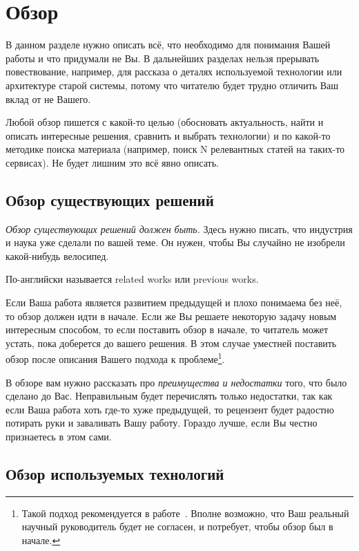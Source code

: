 
\section{Обзор}
\label{sec:relatedworks}

В данном разделе нужно описать всё, что необходимо для понимания Вашей работы и что придумали не Вы. В дальнейших разделах нельзя прерывать повествование, например, для рассказа о деталях используемой технологии или архитектуре старой системы, потому что читателю будет трудно отличить Ваш вклад от не Вашего.

Любой обзор пишется с какой-то целью (обосновать актуальность, найти и описать интересные решения, сравнить и выбрать технологии) и по какой-то методике поиска материала (например, поиск N релевантных статей на таких-то сервисах). Не будет лишним это всё явно описать.

\subsection{Обзор существующих решений}

\emph{Обзор существующих решений должен быть.} Здесь нужно писать, что индустрия и наука уже сделали по вашей теме. Он нужен, чтобы Вы случайно не изобрели какой-нибудь велосипед.

По-английски называется related works или previous works.

Если Ваша работа является развитием предыдущей и плохо понима\-ема без неё, то обзор должен идти в начале. Если же Вы решаете некоторую задачу новым интересным способом, то если поставить обзор в начале, то читатель может устать, пока доберется до вашего решения. В этом случае уместней поставить обзор после описания Вашего подхода к проблеме\footnote{Такой подход рекомендуется в работе~\cite{SPJGreatPaper}.
    Вполне возможно, что Ваш реальный научный руководитель будет не согласен, и потребует, чтобы обзор был в начале.}.

В обзоре вам нужно рассказать про \emph{преимущества и недостатки} того, что было сделано до Вас.
Неправильным будет перечислять только недостатки, так как если Ваша работа хоть где-то хуже предыдущей, то рецензент будет радостно потирать руки и заваливать Вашу работу.
Гораздо лучше, если Вы честно признаетесь в этом сами.

\subsection{Обзор используемых технологий}

